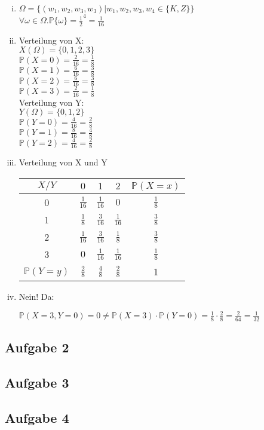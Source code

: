 \documentclass[10pt,a4paper,parskip=half]{scrartcl}
\begin{document}
\begin{enumerate}[(i)]
\item  
$ \Omega = \{ (w_1,w_2,w_3,w_3) | w_1,w_2,w_3,w_4 \in \{K,Z\} \} $ \\
$ \forall \omega \in \Omega . \mathbb{P}\{\omega\} = \frac{1}{2}^4 = \frac{1}{16}  $

\item
Verteilung von X:\\
$X(\Omega) = \{0,1,2,3\}$\\
$\mathbb{P}(X = 0) = \frac{2}{16} = \frac{1}{8}$\\
$\mathbb{P}(X = 1) = \frac{6}{16} = \frac{3}{8}$\\
$\mathbb{P}(X = 2) = \frac{6}{16} = \frac{3}{8}$\\
$\mathbb{P}(X = 3) = \frac{2}{16} = \frac{1}{8}$\\

Verteilung von Y:\\
$Y(\Omega) = \{0,1,2\}$\\
$\mathbb{P}(Y = 0) = \frac{4}{16} = \frac{2}{8}$\\
$\mathbb{P}(Y = 1) = \frac{8}{16} = \frac{4}{8}$\\
$\mathbb{P}(Y = 2) = \frac{4}{16} = \frac{2}{8}$\\

\item\leavevmode\vadjust{\vspace{-\baselineskip}}\newline
Verteilung von X und Y
\begin{tabular}{c | c c c | c}
$X/Y$ & $0$ & $1$ & $2$ & $\mathbb{P}(X=x) $\\ \hline
0 & $\frac{1}{16}$ & $\frac{1}{16}$ & $0$ & $\frac{1}{8}$ \\
1 & $\frac{1}{8}$ & $\frac{3}{16}$ & $\frac{1}{16}$ & $\frac{3}{8}$ \\
2 & $\frac{1}{16}$ & $\frac{3}{16}$ & $\frac{1}{8}$ & $\frac{3}{8}$ \\
3 & $0$ & $\frac{1}{16}$ & $\frac{1}{16}$ & $\frac{1}{8}$ \\ \hline
$\mathbb{P}(Y=y)$ & $\frac{2}{8}$ & $\frac{4}{8}$ & $\frac{2}{8}$ & 1
\end{tabular}

\item
Nein! Da: \\\begin{center}
 $\mathbb{P}(X  = 3, Y = 0) = 0 \neq \mathbb{P}(X = 3) \cdot \mathbb{P}(Y = 0) = \frac{1}{8} \cdot \frac{2}{8} = \frac{2}{64} = \frac{1}{32}$
\end{center}
\end{enumerate}


\subsection*{Aufgabe 2}

\subsection*{Aufgabe 3}

\subsection*{Aufgabe 4}
\end{document}
